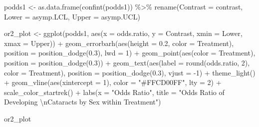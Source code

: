 \documentclass[
]{article}
\newenvironment{Shaded}{\begin{snugshade}}{\end{snugshade}}
\newcommand{\AttributeTok}[1]{\textcolor[rgb]{0.77,0.63,0.00}{#1}}
\newcommand{\DecValTok}[1]{\textcolor[rgb]{0.00,0.00,0.81}{#1}}
\newcommand{\FloatTok}[1]{\textcolor[rgb]{0.00,0.00,0.81}{#1}}
\newcommand{\FunctionTok}[1]{\textcolor[rgb]{0.00,0.00,0.00}{#1}}
\newcommand{\NormalTok}[1]{#1}
\newcommand{\OtherTok}[1]{\textcolor[rgb]{0.56,0.35,0.01}{#1}}
\newcommand{\SpecialCharTok}[1]{\textcolor[rgb]{0.00,0.00,0.00}{#1}}
\newcommand{\StringTok}[1]{\textcolor[rgb]{0.31,0.60,0.02}{#1}}
\begin{document}
\begin{Shaded}
\begin{Highlighting}[]
\NormalTok{podds1 }\OtherTok{\textless{}{-}} \FunctionTok{as.data.frame}\NormalTok{(}\FunctionTok{confint}\NormalTok{(podds1)) }\SpecialCharTok{\%\textgreater{}\%}
  \FunctionTok{rename}\NormalTok{(}\AttributeTok{Contrast =}\NormalTok{ contrast, }\AttributeTok{Lower =}\NormalTok{ asymp.LCL, }\AttributeTok{Upper =}\NormalTok{ asymp.UCL)}

\NormalTok{or2\_plot }\OtherTok{\textless{}{-}} \FunctionTok{ggplot}\NormalTok{(podds1, }\FunctionTok{aes}\NormalTok{(}\AttributeTok{x =}\NormalTok{ odds.ratio, }\AttributeTok{y =}\NormalTok{ Contrast, }\AttributeTok{xmin =}\NormalTok{ Lower, }\AttributeTok{xmax =}\NormalTok{ Upper)) }\SpecialCharTok{+}
  \FunctionTok{geom\_errorbarh}\NormalTok{(}\FunctionTok{aes}\NormalTok{(}\AttributeTok{height =} \FloatTok{0.2}\NormalTok{, }\AttributeTok{color =}\NormalTok{ Treatment),}
                 \AttributeTok{position =} \FunctionTok{position\_dodge}\NormalTok{(}\FloatTok{0.3}\NormalTok{), }\AttributeTok{lwd =} \DecValTok{1}\NormalTok{) }\SpecialCharTok{+}
  \FunctionTok{geom\_point}\NormalTok{(}\FunctionTok{aes}\NormalTok{(}\AttributeTok{color =}\NormalTok{ Treatment), }\AttributeTok{position =} \FunctionTok{position\_dodge}\NormalTok{(}\FloatTok{0.3}\NormalTok{)) }\SpecialCharTok{+}
  \FunctionTok{geom\_text}\NormalTok{(}\FunctionTok{aes}\NormalTok{(}\AttributeTok{label =} \FunctionTok{round}\NormalTok{(odds.ratio, }\DecValTok{2}\NormalTok{), }\AttributeTok{color =}\NormalTok{ Treatment), }
            \AttributeTok{position =} \FunctionTok{position\_dodge}\NormalTok{(}\FloatTok{0.3}\NormalTok{), }\AttributeTok{vjust =} \SpecialCharTok{{-}}\DecValTok{1}\NormalTok{) }\SpecialCharTok{+}
  \FunctionTok{theme\_light}\NormalTok{() }\SpecialCharTok{+}
  \FunctionTok{geom\_vline}\NormalTok{(}\FunctionTok{aes}\NormalTok{(}\AttributeTok{xintercept =} \DecValTok{1}\NormalTok{), }\AttributeTok{color =} \StringTok{"\#FFCD00FF"}\NormalTok{, }\AttributeTok{lty =} \DecValTok{2}\NormalTok{) }\SpecialCharTok{+}
  \FunctionTok{scale\_color\_startrek}\NormalTok{() }\SpecialCharTok{+}
  \FunctionTok{labs}\NormalTok{(}\AttributeTok{x =} \StringTok{"Odds Ratio"}\NormalTok{,}
       \AttributeTok{title =} \StringTok{"Odds Ratio of Developing }\SpecialCharTok{\textbackslash{}n}\StringTok{Cataracts by Sex within Treatment"}\NormalTok{)}

\NormalTok{or2\_plot}
\end{Highlighting}
\end{Shaded}
\end{document}

